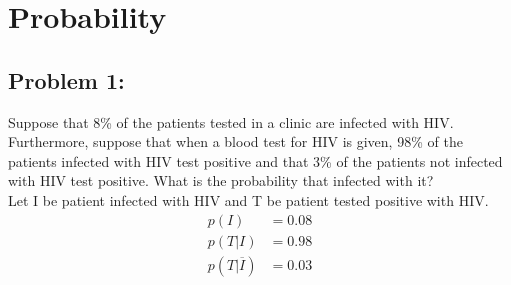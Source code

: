 \documentclass[a4paper]{article}
\begin{document}
\section*{Probability}
\subsection*{Problem 1:}
Suppose that 8\% of the patients tested in a clinic are infected with HIV. Furthermore, suppose that when a blood test for HIV is given, 98\% of the patients infected with HIV test positive and that 3\% of the patients not infected with HIV test positive. What is the probability that infected with it? \\

Let	I be patient infected with HIV and T be patient tested positive with HIV.
\begin{align*}
	p(I)              & = 0.08 \\
	p(T|I)            & = 0.98 \\
	p(T|\overline{I}) & = 0.03
\end{align*}
\end{document}
